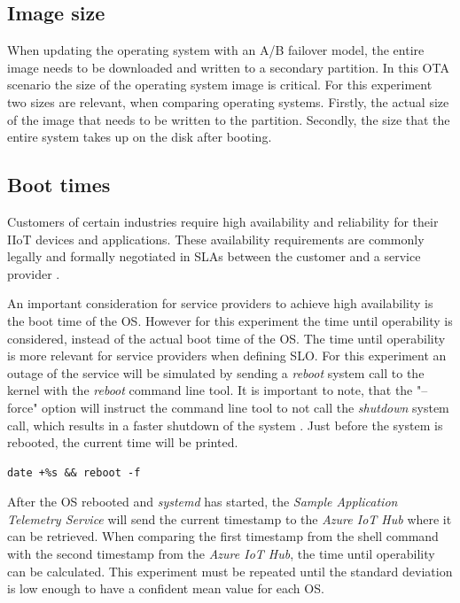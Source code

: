 \subsection{Image size}
When updating the operating system with an A/B failover model, the entire
image needs to be downloaded and written to a secondary partition. In this
\ac{OTA} scenario the size of the operating system image is critical.
For this experiment two sizes are relevant, when comparing operating systems.
Firstly, the actual size of the image that needs to be written to the partition.
Secondly, the size that the entire system takes up on the disk after booting.

\subsection{Boot times}
Customers of certain industries require high availability and reliability for
their \ac{IIoT} devices and applications. These availability requirements
are commonly legally and formally negotiated in \ac{SLA}s between
the customer and a service provider \cite{msdoc-slas}.

An important consideration for service providers to achieve high
availability is the boot time of the \ac{OS}. However for this experiment the
time until operability is considered, instead of the actual boot time of the
\ac{OS}. The time until operability is more relevant for service providers
when defining \ac{SLO}.
For this experiment an outage of the service will be simulated by sending a
\textit{reboot} system call to the kernel with the \textit{reboot}
command line tool. It is important to note, that the "--force" option will
instruct the command line tool to not call the \textit{shutdown} system call,
which results in a faster shutdown of the system \cite{man-reboot}\cite{man-shutdown}.
Just before the system is rebooted, the current time will be printed.
\\

\begin{lstlisting}[caption=Command to print the current time and reboot]
date +%s && reboot -f
\end{lstlisting}
After the \ac{OS} rebooted and \textit{systemd} has started, the
\textit{Sample Application Telemetry Service} will send the current timestamp
to the \textit{Azure IoT Hub} where it can be retrieved. When comparing
the first timestamp from the shell command with the second timestamp from
the \textit{Azure IoT Hub}, the time until operability can be calculated.
This experiment must be repeated until the standard deviation is low enough
to have a confident mean value for each \ac{OS}.



